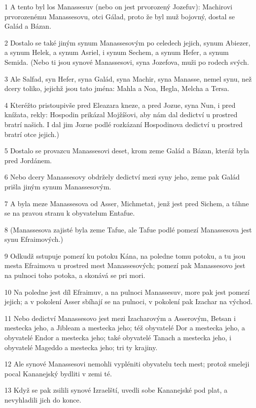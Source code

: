 \par 1 A tento byl los Manassesuv (nebo on jest prvorozený Jozefuv): Machirovi prvorozenému Manassesovu, otci Gálad, proto že byl muž bojovný, dostal se Galád a Bázan.
\par 2 Dostalo se také jiným synum Manassesovým po celedech jejich, synum Abiezer, a synum Helek, a synum Asriel, i synum Sechem, a synum Hefer, a synum Semida. (Nebo ti jsou synové Manassesovi, syna Jozefova, muži po rodech svých.
\par 3 Ale Salfad, syn Hefer, syna Galád, syna Machir, syna Manasse, nemel synu, než dcery toliko, jejichž jsou tato jména: Mahla a Noa, Hegla, Melcha a Tersa.
\par 4 Kteréžto pristoupivše pred Eleazara kneze, a pred Jozue, syna Nun, i pred knížata, rekly: Hospodin prikázal Mojžíšovi, aby nám dal dedictví u prostred bratrí našich. I dal jim Jozue podlé rozkázaní Hospodinova dedictví u prostred bratrí otce jejich.)
\par 5 Dostalo se provazcu Manassesovi deset, krom zeme Galád a Bázan, kteráž byla pred Jordánem.
\par 6 Nebo dcery Manassesovy obdržely dedictví mezi syny jeho, zeme pak Galád prišla jiným synum Manassesovým.
\par 7 A byla meze Manassesova od Asser, Michmetat, jenž jest pred Sichem, a táhne se na pravou stranu k obyvatelum Entafue.
\par 8 (Manassesova zajisté byla zeme Tafue, ale Tafue podlé pomezí Manassesova jest synu Efraimových.)
\par 9 Odkudž sstupuje pomezí ku potoku Kána, na poledne tomu potoku, a tu jsou mesta Efraimova u prostred mest Manassesových; pomezí pak Manassesovo jest na pulnoci toho potoka, a skonává se pri mori.
\par 10 Na poledne jest díl Efraimuv, a na pulnoci Manassesuv, more pak jest pomezí jejich; a v pokolení Asser sbíhají se na pulnoci, v pokolení pak Izachar na východ.
\par 11 Nebo dedictví Manassesovo jest mezi Izacharovým a Asserovým, Betsan i mestecka jeho, a Jibleam a mestecka jeho; též obyvatelé Dor a mestecka jeho, a obyvatelé Endor a mestecka jeho; také obyvatelé Tanach a mestecka jeho, i obyvatelé Mageddo a mestecka jeho; tri ty krajiny.
\par 12 Ale synové Manassesovi nemohli vypléniti obyvatelu tech mest; protož smeleji pocal Kananejský bydliti v zemi té.
\par 13 Když se pak zsilili synové Izraelští, uvedli sobe Kananejské pod plat, a nevyhladili jich do konce.
